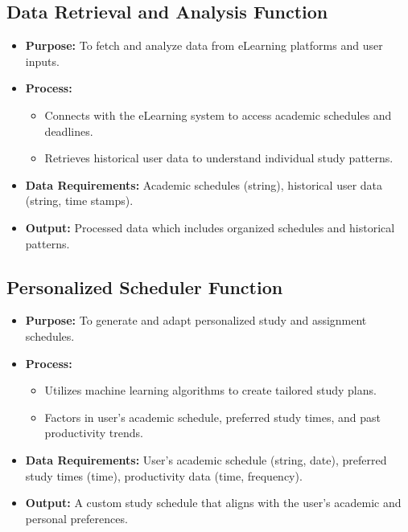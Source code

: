 \documentclass[12pt]{article}
\begin{document}
    \subsection*{Data Retrieval and Analysis Function}
\begin{itemize}
    \item \textbf{Purpose:} To fetch and analyze data from eLearning platforms and user inputs.
    \item \textbf{Process:}
    \begin{itemize}
        \item Connects with the eLearning system to access academic schedules and deadlines.
        \item Retrieves historical user data to understand individual study patterns.
    \end{itemize}
    \item \textbf{Data Requirements:} Academic schedules (string), historical user data (string, time stamps).
    \item \textbf{Output:} Processed data which includes organized schedules and historical patterns.
\end{itemize}

\subsection*{Personalized Scheduler Function}
\begin{itemize}
    \item \textbf{Purpose:} To generate and adapt personalized study and assignment schedules.
    \item \textbf{Process:}
    \begin{itemize}
        \item Utilizes machine learning algorithms to create tailored study plans.
        \item Factors in user's academic schedule, preferred study times, and past productivity trends.
    \end{itemize}
    \item \textbf{Data Requirements:} User's academic schedule (string, date), preferred study times (time), productivity data (time, frequency).
    \item \textbf{Output:} A custom study schedule that aligns with the user’s academic and personal preferences.
\end{itemize}
\end{document}
